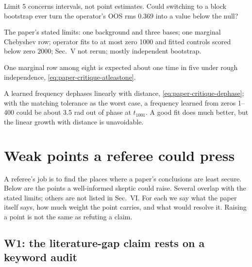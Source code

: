 \begin{checkpoint}
Limit 5 concerns intervals, not point estimates. Could switching to a block bootstrap ever turn the operator's OOS rms $0.369$ into a value below the null?
\end{checkpoint}

\begin{keyideas}
\item The paper's stated limits: one background and three bases; one marginal Chebyshev row; operator fits to at most zero 1000 and fitted controls scored below zero 2000; Sec.~V not rerun; mostly independent bootstrap.
\item One marginal row among eight is expected about one time in five under rough independence, \eqref{eq:paper-critique-atleastone}.
\item A learned frequency dephases linearly with distance, \eqref{eq:paper-critique-dephase}; with the matching tolerance as the worst case, a frequency learned from zeros 1--400 could be about 3.5 rad out of phase at $t_{1001}$. A good fit does much better, but the linear growth with distance is unavoidable.
\end{keyideas}

\section{Weak points a referee could press}\label{sec:paper-critique-weak}

A referee's job is to find the places where a paper's conclusions are least secure. Below are the points a well-informed skeptic could raise. Several overlap with the stated limits; others are not listed in Sec.~VI. For each we say what the paper itself says, how much weight the point carries, and what would resolve it. Raising a point is not the same as refuting a claim.

\subsection{W1: the literature-gap claim rests on a keyword audit}

